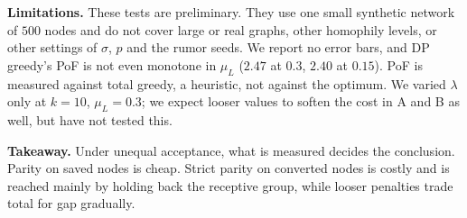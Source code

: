 \textbf{Limitations.} These tests are preliminary. They use one small synthetic network of $500$ nodes and do not cover large or real graphs, other homophily levels, or other settings of $\sigma$, $p$ and the rumor seeds. We report no error bars, and DP greedy's PoF is not even monotone in $\mu_L$ ($2.47$ at $0.3$, $2.40$ at $0.15$). PoF is measured against total greedy, a heuristic, not against the optimum. We varied $\lambda$ only at $k=10$, $\mu_L=0.3$; we expect looser values to soften the cost in A and B as well, but have not tested this.

\textbf{Takeaway.} Under unequal acceptance, what is measured decides the conclusion. Parity on saved nodes is cheap. Strict parity on converted nodes is costly and is reached mainly by holding back the receptive group, while looser penalties trade total for gap gradually.
